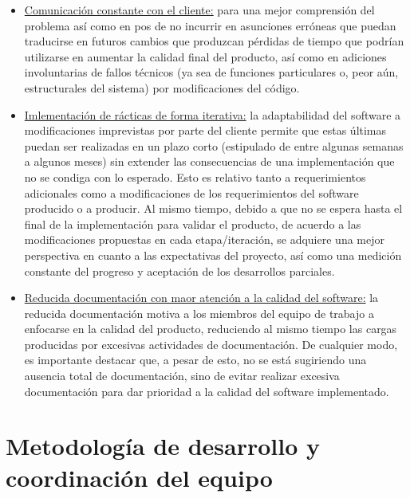 \documentclass[a4paper, 12pt,twoside]{report}  %
\numberwithin{equation}{subsection} %
\begin{document}
\begin{itemize}
	\item \underline{Comunicación constante con el cliente:} para una mejor comprensión del problema así como en pos de no incurrir en asunciones erróneas que puedan traducirse en futuros cambios que produzcan pérdidas de tiempo que podrían utilizarse en aumentar la calidad final del producto, así como en adiciones involuntarias de fallos técnicos (ya sea de funciones particulares o, peor aún, estructurales del sistema) por modificaciones del código.
	\item \underline{Imlementación de rácticas de forma iterativa:} la adaptabilidad del software a modificaciones imprevistas por parte del cliente permite que estas últimas puedan ser realizadas en un plazo corto (estipulado de entre algunas semanas a algunos meses) sin extender las consecuencias de una implementación que no se condiga con lo esperado. Esto es relativo tanto a requerimientos adicionales como a modificaciones de los requerimientos del software producido o a producir. Al mismo tiempo, debido a que no se espera hasta el final de la implementación para validar el producto, de acuerdo a las modificaciones propuestas en cada etapa/iteración, se adquiere una mejor perspectiva en cuanto a las expectativas del proyecto, así como una medición constante del progreso y aceptación de los desarrollos parciales.
	\item \underline{Reducida documentación con maor atención a la calidad del software:} la reducida documentación motiva a los miembros del equipo de trabajo a enfocarse en la calidad del producto, reduciendo al mismo tiempo las cargas producidas por excesivas actividades de documentación. De cualquier modo, es importante destacar que, a pesar de esto, no se está sugiriendo una ausencia total de documentación, sino de evitar realizar excesiva documentación para dar prioridad a la calidad del software implementado.
\end{itemize}

\section{Metodología de desarrollo y coordinación del equipo}
\label{Metodología de desarrollo y coordinación del equipo}
\end{document}
